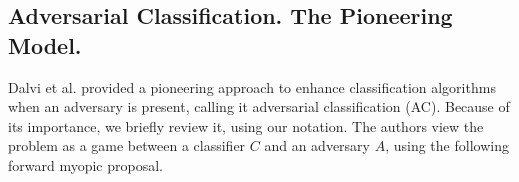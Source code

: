 \subsection{Adversarial Classification. The Pioneering Model.%
}
Dalvi et al. \parencite{adversarialClassification2004} provided a pioneering approach to enhance classification algorithms when an adversary is present, calling it adversarial classification (AC).
 Because of its importance,
we briefly review it, using our notation. 
The authors view the problem as a game between a classifier $C$ and an adversary $A$,
using the following forward myopic proposal.


